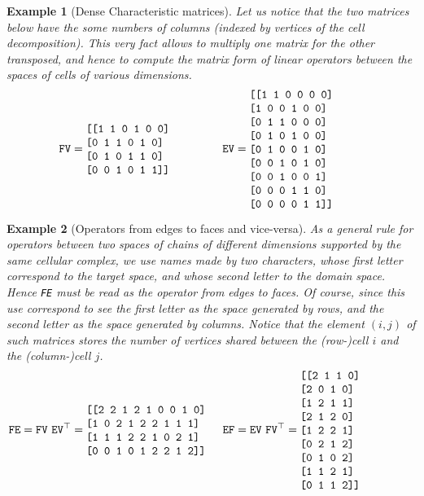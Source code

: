 \documentclass[11pt,oneside]{article}    %
\newtheorem{example}{Example}
\begin{document}
\begin{example}[Dense Characteristic matrices]\label{ex:denseMat}
Let us notice that the two matrices below have the some numbers of columns (indexed by vertices of the cell decomposition).
This very fact allows to multiply one matrix for the other transposed, and hence to compute the matrix form of linear operators between the spaces of cells of various dimensions.
\[
\texttt{FV} =
\begin{minipage}[c]{0.29\linewidth}
\begin{verbatim}
[[1 1 0 1 0 0]
 [0 1 1 0 1 0]
 [0 1 0 1 1 0]
 [0 0 1 0 1 1]]
\end{verbatim}
\end{minipage}
\qquad
\texttt{EV} =
\begin{minipage}[c]{0.29\linewidth}
\begin{verbatim}
[[1 1 0 0 0 0]
 [1 0 0 1 0 0]
 [0 1 1 0 0 0]
 [0 1 0 1 0 0]
 [0 1 0 0 1 0]
 [0 0 1 0 1 0]
 [0 0 1 0 0 1]
 [0 0 0 1 1 0]
 [0 0 0 0 1 1]]
\end{verbatim}
\end{minipage}
\]
\end{example}

\begin{example}[Operators from edges to faces and vice-versa]\label{ex:denseMat}
As a general rule for operators between two spaces of chains of different dimensions supported by the \emph{same} cellular complex, we use names made by two characters, whose first letter correspond to the target space, and whose second letter to the domain space. Hence \texttt{FE} must be read as the operator from edges to faces. Of course, since this use correspond to see the first letter as the space generated by rows, and the second letter as the space generated by columns. Notice that the element $(i,j)$ of such matrices stores the number of vertices shared between the (row-)cell $i$ and the (column-)cell $j$.
\[
\texttt{FE} = \texttt{FV}\ \texttt{EV}^\top = 
\begin{minipage}[c]{0.29\linewidth}
\begin{verbatim}
[[2 2 1 2 1 0 0 1 0]
 [1 0 2 1 2 2 1 1 1]
 [1 1 1 2 2 1 0 2 1]
 [0 0 1 0 1 2 2 1 2]]
\end{verbatim}
\end{minipage}
\qquad
\texttt{EF} = \texttt{EV}\ \texttt{FV}^\top = 
\begin{minipage}[c]{0.29\linewidth}
\begin{verbatim}
[[2 1 1 0]
 [2 0 1 0]
 [1 2 1 1]
 [2 1 2 0]
 [1 2 2 1]
 [0 2 1 2]
 [0 1 0 2]
 [1 1 2 1]
 [0 1 1 2]]
\end{verbatim}
\end{minipage}
\]
\end{example}
\end{document}
